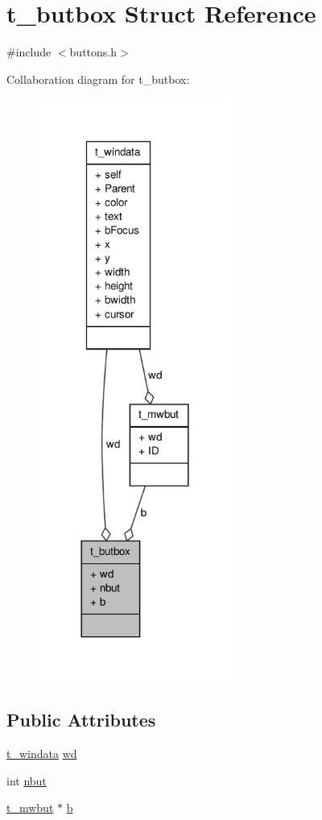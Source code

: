 \hypertarget{structt__butbox}{\section{t\-\_\-butbox \-Struct \-Reference}
\label{structt__butbox}
}


{\ttfamily \#include $<$buttons.\-h$>$}



\-Collaboration diagram for t\-\_\-butbox\-:
\nopagebreak
\begin{figure}[H]
\begin{center}
\leavevmode
\includegraphics[width=179pt]{structt__butbox__coll__graph}
\end{center}
\end{figure}
\subsection*{\-Public \-Attributes}
\begin{DoxyCompactItemize}
\item 
\hyperlink{structt__windata}{t\-\_\-windata} \hyperlink{structt__butbox_a57b61cd17456fed375be08d7da00fa97}{wd}
\item 
int \hyperlink{structt__butbox_a040d93820736681a2d7d08e3d90defcd}{nbut}
\item 
\hyperlink{structt__mwbut}{t\-\_\-mwbut} $\ast$ \hyperlink{structt__butbox_a9c7e6a0a4b8fcdab5db651edd79676d5}{b}
\end{DoxyCompactItemize}


